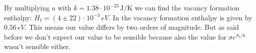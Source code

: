 By multiplying $a$ with $k = 1.38 \cdot 10^{-23}\,\si{\joule/\kelvin}$ \cite{boltzmann} we can find the vacancy formation enthalpy: $H_t = (4 \pm 22) \cdot 10^{-3}\,\si{eV}$. In \cite{enthalpy} the vacancy formation enthalpy is given by $0.56\,\si{eV}$. This means our value differs by two orders of magnitude. But as said before we don't expect our value to be sensible because also the value for $\sigma e^{S_t/k}$ wasn't sensible either. 